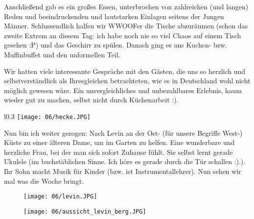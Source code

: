 Anschließend gab es ein großes Essen, unterbrochen von zahlreichen
(und langen) Reden und beeindruckenden und lautstarken Einlagen
seitens der Jungen Männer.  Schlussendlich halfen wir WWOOFer die
Tische abzuräumen (schon das zweite Extrem an diesem Tag: ich habe
noch nie so viel Chaos auf einem Tisch gesehen :P) und das Geschirr zu
spülen. Danach ging es ans Kuchen- bzw. Muffinbuffet und den
unformellen Teil.

Wir hatten viele interessante Gespräche mit den
Gästen, die uns so herzlich und selbstverständlich als Ihresgleichen
betrachteten, wie es in Deutschland wohl nicht möglich gewesen
wäre. Ein unvergleichliches und unbezahlbares Erlebnis, kaum wieder
gut zu machen, selbst nicht durch Küchenarbeit :).

\begin{wrapfigure}{l}{0.3\textwidth}
  \centering
  \texttt{[image: 06/hecke.JPG]}
\end{wrapfigure}
Nun bin ich weiter gezogen: Nach Levin an der Ost- (für unsere
Begriffe West-) Küste zu einer älteren Dame, um im Garten zu
helfen. Eine wunderbare und herzliche Frau, bei der man sich sofort
Zuhause fühlt.  Sie selbst lernt gerade Ukulele (im buchstäblichen
Sinne. Ich höre es gerade durch die Tür schallen :).). Ihr Sohn macht
Musik für Kinder (bzw. ist Instrumentallehrer). Nun sehen wir mal was
die Woche bringt.

\begin{figure}[p]
  \centering
  \texttt{[image: 06/levin.JPG]}
\end{figure}
\begin{figure}[p]
  \centering
  \texttt{[image: 06/aussicht\_levin\_berg.JPG]}
\end{figure}

